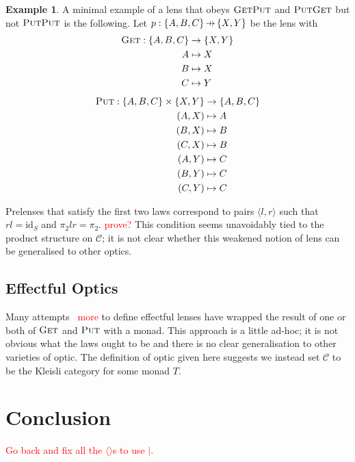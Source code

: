 \documentclass[11pt,a4paper]{article}
\theoremstyle{plain}
\theoremstyle{definition}
\newtheorem{example}[theorem]{Example}
\newcommand{\C}{\mathscr{C}}
\newcommand{\id}{\mathrm{id}}
\newcommand{\fget}{\textsc{Get}}
\newcommand{\fput}{\textsc{Put}}
\newcommand{\hto}{\ensuremath{\,\mathaccent\shortmid\rightarrow\,}}
\newcommand{\todo}[1]{\textcolor{red}{\small #1}}
\begin{document}
\begin{example}
  A minimal example of a lens that obeys $\fget\fput$ and $\fput\fget$ but not $\fput\fput$ is the following. Let $p : \{A,B,C\} \hto \{X, Y\}$ be the lens with
  \begin{align*}
    \fget : \{A,B,C\} &\to \{X, Y\} \\
    A &\mapsto X \\
    B &\mapsto X \\
    C &\mapsto Y
  \end{align*}
  \begin{align*}
    \fput : \{A,B,C\} \times \{X, Y\} &\to \{A,B,C\} \\
    (A,X) &\mapsto A \\
    (B,X) &\mapsto B \\
    (C,X) &\mapsto B \\
    (A,Y) &\mapsto C \\
    (B,Y) &\mapsto C \\
    (C,Y) &\mapsto C
  \end{align*}
\end{example}

Prelenses that satisfy the first two laws correspond to pairs $\langle l, r \rangle$ such that $rl = \id_S$ and $\pi_2lr = \pi_2$. \todo{prove?} This condition seems unavoidably tied to the product structure on $\C$; it is not clear whether this weakened notion of lens can be generalised to other optics.

\subsection{Effectful Optics}

Many attempts~\cite{ReflectionsOnMonadicLenses} \todo{more} to define effectful lenses have wrapped the result of one or both of $\fget$ and $\fput$ with a monad. This approach is a little ad-hoc; it is not obvious what the laws ought to be and there is no clear generalisation to other varieties of optic. The definition of optic given here suggests we instead set $\C$ to be the Kleisli category for some monad $T$.

\section{Conclusion}

\todo{Go back and fix all the $\langle \rangle$s to use $\mid$.}



\end{document}
